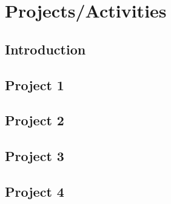
\chapter{Projects/Activities} %

\label{Chapter3}

\section{Introduction}


\section{Project 1}


\section{Project 2}


\section{Project 3}


\section{Project 4}


